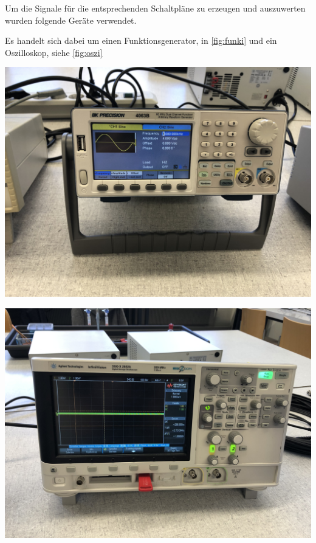 \documentclass[11pt,ngerman]{scrartcl}
\begin{document}
\vspace{2mm}

\noindent Um die Signale für die entsprechenden Schaltpläne zu erzeugen und auszuwerten wurden folgende Geräte verwendet.

\vspace{2mm}

\noindent Es handelt sich dabei um einen Funktionsgenerator, in \autoref{fig:funki} und ein Oszilloskop, siehe \autoref{fig:oszi}

\vspace{2mm}

\begin{minipage}{\textwidth}
	\begin{minipage}[t]{0.5\textwidth}
		\centering
		\includegraphics[width=\textwidth]{funki}
		\label{fig:funki}
	\end{minipage}
	\vspace{2mm}
	\begin{minipage}[t]{0.50\textwidth}
		\centering
		\includegraphics[width=\textwidth]{oszi}
		\label{fig:oszi}
	\end{minipage}
	\vspace{1em}
\end{minipage}
\end{document}
